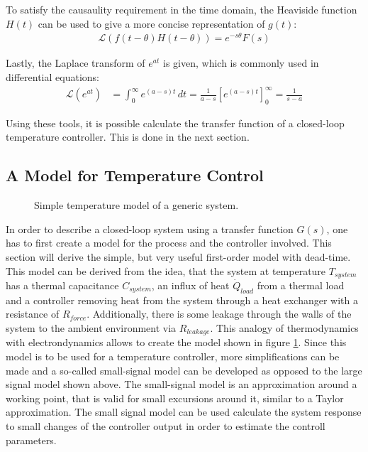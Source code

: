 To satisfy the causaulity requirement in the time domain, the Heaviside function $H(t)$ can be used to give a more concise representation of $g(t)$:
\begin{align}
    \mathscr{L}\left( f(t-\theta) H(t-\theta) \right) = e^{-s\theta} F(s) \label{eqn:laplace_causality}
\end{align}

Lastly, the Laplace transform of $e^{at}$ is given, which is commonly used in differential equations:
\begin{align}
    \mathscr{L}\left(e^{at} \right) &= \int_0^\infty e^{(a-s)t}\,dt = \frac{1}{a-s} \left[e^{(a-s)t} \right]_0^\infty = \frac{1}{s-a} \label{eqn:laplace_exponential}
\end{align}


Using these tools, it is possible calculate the transfer function of a closed-loop temperature controller. This is done in the next section.

\clearpage
\subsection{A Model for Temperature Control}
\label{sec:temperature_control_model}
\begin{figure}[ht]
    \centering
    \caption{Simple temperature model of a generic system.}
    \label{fig:first_order_model_room}
\end{figure}

In order to describe a closed-loop system using a transfer function $G(s)$, one has to first create a model for the process and the controller involved. This section will derive the simple, but very useful first-order model with dead-time. This model can be derived from the idea, that the system at temperature $T_{system}$ has a thermal capacitance $C_{system}$, an influx of heat $\dot Q_{load}$ from a thermal load and a controller removing heat from the system through a heat exchanger with a resistance of $R_{force}$. Additionally, there is some leakage through the walls of the system to the ambient environment via $R_{leakage}$. This analogy of thermodynamics with electrondynamics allows to create the model shown in figure \ref{fig:first_order_model_room}. Since this model is to be used for a temperature controller, more simplifications can be made and a so-called small-signal model can be developed as opposed to the large signal model shown above. The small-signal model is an approximation around a working point, that is valid for small excursions around it, similar to a Taylor approximation. The small signal model can be used calculate the system response to small changes of the controller output in order to estimate the controll parameters.

